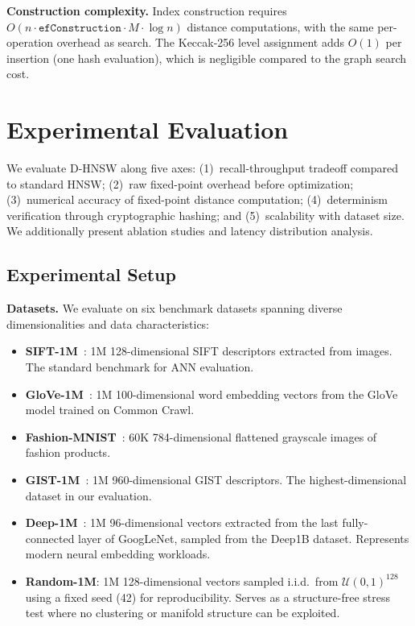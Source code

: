 \documentclass[10pt,journal]{IEEEtran}
\newcommand{\dhnsw}{\textsc{D-HNSW}}
\newcommand{\hnsw}{\textsc{HNSW}}
\begin{document}
\textbf{Construction complexity.} Index construction requires $O(n \cdot \texttt{efConstruction} \cdot M \cdot \log n)$ distance computations, with the same per-operation overhead as search. The Keccak-256 level assignment adds $O(1)$ per insertion (one hash evaluation), which is negligible compared to the graph search cost.


\section{Experimental Evaluation}
\label{sec:experiments}

We evaluate \dhnsw{} along five axes: (1)~recall-throughput tradeoff compared to standard \hnsw{}; (2)~raw fixed-point overhead before optimization; (3)~numerical accuracy of fixed-point distance computation; (4)~determinism verification through cryptographic hashing; and (5)~scalability with dataset size. We additionally present ablation studies and latency distribution analysis.

\subsection{Experimental Setup}

\textbf{Datasets.} We evaluate on six benchmark datasets spanning diverse dimensionalities and data characteristics:

\begin{itemize}[leftmargin=*]
  \item \textbf{SIFT-1M}~\cite{jegou2011sift}: 1M 128-dimensional SIFT descriptors extracted from images. The standard benchmark for ANN evaluation.
  \item \textbf{GloVe-1M}~\cite{pennington2014glove}: 1M 100-dimensional word embedding vectors from the GloVe model trained on Common Crawl.
  \item \textbf{Fashion-MNIST}~\cite{xiao2017fashion}: 60K 784-dimensional flattened grayscale images of fashion products.
  \item \textbf{GIST-1M}~\cite{oliva2001gist}: 1M 960-dimensional GIST descriptors. The highest-dimensional dataset in our evaluation.
  \item \textbf{Deep-1M}~\cite{babenko2016deep1b}: 1M 96-dimensional vectors extracted from the last fully-connected layer of GoogLeNet, sampled from the Deep1B dataset. Represents modern neural embedding workloads.
  \item \textbf{Random-1M}: 1M 128-dimensional vectors sampled i.i.d.\ from $\mathcal{U}(0,1)^{128}$ using a fixed seed (42) for reproducibility. Serves as a structure-free stress test where no clustering or manifold structure can be exploited.
\end{itemize}
\end{document}
